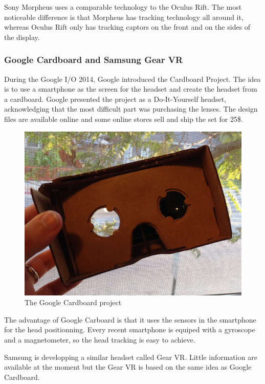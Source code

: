 \documentclass[12pt, twoside]{article}
\begin{document}
Sony Morpheus uses a comparable technology to the Oculus Rift. The most noticeable difference is that Morpheus has tracking technology all around it, whereas Oculus Rift only has tracking captors on the front and on the sides of the display.

\subsubsection{Google Cardboard and Samsung Gear VR}
During the Google I/O 2014, Google introduced the Cardboard Project. The idea is to use a smartphone as the screen for the headset and create the headset from a cardboard. Google presented the project as a Do-It-Yourself headset, acknowledging that the most difficult part was purchasing the lenses. The design files are available online and some online stores sell and ship the set for 25\$.

\begin{figure}[h]
  \centering
  \includegraphics[scale=0.1]{GoogleCardboard.jpg}
  \caption{\label{fig:cardboard} The Google Cardboard project\protect\footnotemark}
\end{figure}

The advantage of Google Carboard is that it uses the sensors in the smartphone for the head positionning. Every recent smartphone is equiped with a gyroscope and a magnetometer, so the head tracking is easy to achieve.

Samsung is developping a similar headset called Gear VR. Little information are available at the moment but the Gear VR is based on the same idea as Google Cardboard.
\end{document}
